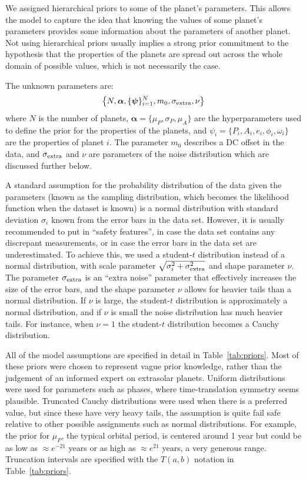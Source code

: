 \documentclass[useAMS,usenatbib]{mn2e}
\begin{document}
We assigned hierarchical priors to some of the planet's parameters. This allows the
model to capture the idea that knowing the values of some planet's parameters
provides some information about the parameters of another planet. Not using
hierarchical priors usually implies a strong prior commitment to the hypothesis
that the properties of the planets are spread out across the whole domain of
possible values, which is not necessarily the case.

The unknown parameters are:
\begin{eqnarray}
\left\{N, \boldsymbol{\alpha}, \{\boldsymbol{\psi}\}_{i=1}^N, m_0, \sigma_{\rm extra}, \nu\right\}
\end{eqnarray}
where $N$ is the number of planets,
$\boldsymbol{\alpha} = \{\mu_P, \sigma_P, \mu_A\}$ are the
hyperparameters used to define the prior for the properties of the planets,
and $\psi_i = \{P_i, A_i, e_i, \phi_i, \omega_i\}$
are the properties of planet $i$.
The parameter $m_0$ describes a DC offset in the data, and
$\sigma_{\rm extra}$ and $\nu$ are parameters of the noise distribution
which are discussed further below.

A standard assumption for the probability distribution of the data given the
parameters (known as the sampling distribution, which becomes the likelihood
function when the dataset is known) is a normal distribution with
standard deviation $\sigma_i$ known from the error bars in the data set.
However, it is usually recommended to put in ``safety features'', in case the
data set contains any discrepant measurements, or in case the error bars in the
data set are underestimated. To achieve this, we used a student-$t$ distribution
instead of a normal distribution, with
scale parameter $\sqrt{\sigma_i^2 + \sigma_{\rm extra}^2}$ and shape parameter $\nu$. The
parameter $\sigma_{\rm extra}$ is an ``extra noise'' parameter that effectively increases the
size of the error bars, and the shape parameter $\nu$ allows for heavier tails
than a normal distribution. If $\nu$ is large, the student-$t$ distribution
is approximately a normal distribution, and if $\nu$ is small the noise
distribution has much heavier tails. For instance, when $\nu=1$ the student-$t$
distribution becomes a Cauchy distribution.

All of the model assumptions are specified in detail in
Table~\ref{tab:priors}. Most of these priors were chosen to represent vague
prior knowledge, rather than the judgement of an informed expert on extrasolar
planets. Uniform distributions were used for parameters such as phases, where
time-translation symmetry seems plausible.
Truncated Cauchy distributions were used when there is a
preferred value, but since these have very heavy tails, the assumption is
quite fail safe relative to other possible assignments such as normal distributions.
For example, the prior for $\mu_P$, the typical orbital period,
is centered around 1 year but could be as low as $\approx e^{-21}$ years or as high
as $\approx e^{21}$ years, a very generous range. Truncation intervals are
specified with the $T(a,b)$ notation in Table~\ref{tab:priors}.
\end{document}
